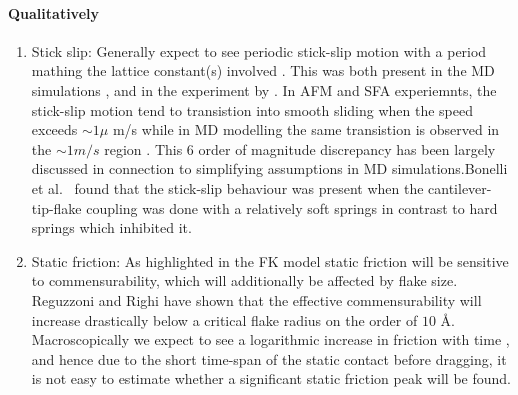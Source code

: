 \paragraph*{Qualitatively}
\begin{enumerate}
  \item Stick slip: Generally expect to see periodic stick-slip motion with a period mathing the lattice constant(s) involved \cite{mo_friction_2009}. This was both present in the MD simulations \cite{zhu_study_2018}, \cite{ma12091425} and in the experiment by \cite{DIENWIEBEL2005197}. In AFM and SFA experiemnts, the stick-slip motion tend to transistion into smooth sliding when the speed exceeds $\sim 1 \mu$ m/s while in MD modelling the same transistion is observed in the $\sim 1 m/s$ region \cite{Manini_2016}. This 6 order of magnitude discrepancy has been largely discussed in connection to simplifying assumptions in MD simulations.Bonelli et al.\ \cite{bonelli_atomistic_2009} found that the stick-slip behaviour was present when the cantilever-tip-flake coupling was done with a relatively soft springs in contrast to hard springs which inhibited it.   

  \item Static friction: As highlighted in the FK model static friction will be sensitive to commensurability, which will additionally be affected by flake size. Reguzzoni and Righi \cite{PhysRevB.85.201412} have shown that the effective commensurability will increase drastically below a critical flake radius on the order of $10$ Å. Macroscopically we expect to see a logarithmic increase in friction with time \cite{dieterich_1972}, and hence due to the short time-span of the static contact before dragging, it is not easy to estimate whether a significant static friction peak will be found. 
  



  

\end{enumerate}
